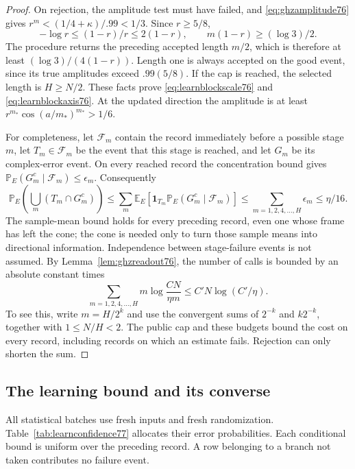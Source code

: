 \begin{proof}
On rejection, the amplitude test must have failed, and
\eqref{eq:ghzamplitude76} gives
$r^m<(1/4+\kappa)/.99<1/3$.
Since $r\ge5/8$,
\[
 -\log r\le(1-r)/r\le2(1-r),
 \qquad m(1-r)\ge(\log3)/2.
\]
The procedure returns the preceding accepted length $m/2$, which
is therefore at least
$(\log3)/(4(1-r))$.  Length one is always accepted on the good
event, since its true amplitudes exceed $.99(5/8)$.  If the cap is
reached, the selected length is $H\ge N/2$.  These facts prove
\eqref{eq:learnblockscale76} and \eqref{eq:learnblockaxis76}.
At the updated direction the amplitude is at least
$r^{m_*}\cos(a/m_*)^{m_*}>1/6$.

For completeness, let $\mathcal F_m$ contain the record immediately
before a possible stage $m$, let $T_m\in\mathcal F_m$ be the event
that this stage is reached, and let $G_m$ be its complex-error event.
On every reached record the concentration bound gives
$\mathbb P_E(G_m^c\mid\mathcal F_m)\le\epsilon_m$.
Consequently
\begin{equation}\label{eq:learnconditionalunion77}
 \mathbb P_E\!\left(\bigcup_m(T_m\cap G_m^c)\right)
 \le\sum_m\mathbb E_E\!\left[
       \boldsymbol1_{T_m}\mathbb P_E(G_m^c\mid\mathcal F_m)\right]
 \le\sum_{m=1,2,4,\ldots,H}\epsilon_m\le\eta/16.
\end{equation}
The sample-mean bound holds for every preceding record, even one
whose frame has left the cone; the cone is needed only to turn
those sample means into directional information.  Independence
between stage-failure events is not assumed.
By Lemma~\ref{lem:ghzreadout76}, the number of calls is bounded by
an absolute constant times
\begin{equation}\label{eq:learndyadiccost76}
 \sum_{m=1,2,4,\ldots,H}
       m\log\frac{CN}{\eta m}
       \le C'N\log(C'/\eta).
\end{equation}
To see this, write $m=H/2^k$ and use the convergent sums of
$2^{-k}$ and $k2^{-k}$, together with $1\le N/H<2$.
The public cap and these budgets bound the cost on every record,
including records on which an estimate fails.  Rejection can only
shorten the sum.
\end{proof}

\subsection{The learning bound and its converse}

All statistical batches use fresh inputs and fresh randomization.
Table~\ref{tab:learnconfidence77} allocates their error probabilities.
Each conditional bound is uniform over the preceding record.  A row
belonging to a branch not taken contributes no failure event.

